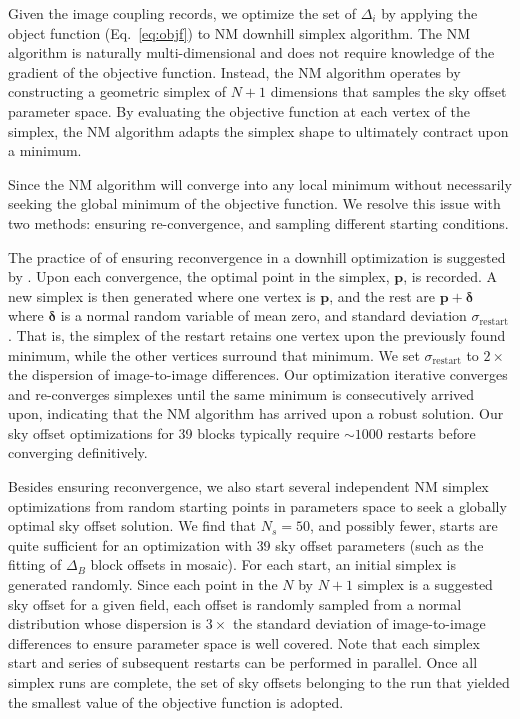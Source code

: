 \documentclass[iop]{emulateapj}
\newcommand{\vect}[1]{\boldsymbol{#1}} %
\newcommand{\Eq}[1]{Eq.~\ref{eq:#1}}  %
\begin{document}
Given the image coupling records, we optimize the set of $\Delta_i$ by applying the object function (\Eq{objf}) to NM downhill simplex algorithm.
The NM algorithm is naturally multi-dimensional and does not require knowledge of the gradient of the objective function.
Instead, the NM algorithm operates by constructing a geometric simplex of $N+1$ dimensions that samples the sky offset parameter space.
By evaluating the objective function at each vertex of the simplex, the NM algorithm adapts the simplex shape to ultimately contract upon a minimum.

Since the NM algorithm will converge into any local minimum without necessarily seeking the global minimum of the objective function.
We resolve this issue with two methods: ensuring re-convergence, and sampling different starting conditions.

The practice of of ensuring reconvergence in a downhill optimization is suggested by \cite{Press:2007}.
Upon each convergence, the optimal point in the simplex, $\vect{p}$, is recorded.
A new simplex is then generated where one vertex is $\vect{p}$, and the rest are $\vect{p}+\vect{\delta}$ where $\vect{\delta}$ is a normal random variable of mean zero, and standard deviation $\sigma_\mathrm{restart}$.
That is, the simplex of the restart retains one vertex upon the previously found minimum, while the other vertices surround that minimum.
We set $\sigma_\mathrm{restart}$ to $2\times$ the dispersion of image-to-image differences.
Our optimization iterative converges and re-converges simplexes until the same minimum is consecutively arrived upon, indicating that the NM algorithm has arrived upon a robust solution.
Our sky offset optimizations for 39 blocks typically require $\sim1000$ restarts before converging definitively.

Besides ensuring reconvergence, we also start several independent NM simplex optimizations from random starting points in parameters space to seek a globally optimal sky offset solution.
We find that $N_s=50$, and possibly fewer, starts are quite sufficient for an optimization with 39 sky offset parameters (such as the fitting of $\Delta_B$ block offsets in mosaic).
For each start, an initial simplex is generated randomly.
Since each point in the $N$ by $N+1$ simplex is a suggested sky offset for a given field, each offset is randomly sampled from a normal distribution whose dispersion is $3\times$ the standard deviation of image-to-image differences to ensure parameter space is well covered.
Note that each simplex start and series of subsequent restarts can be performed in parallel.
Once all simplex runs are complete, the set of sky offsets belonging to the run that yielded the smallest value of the objective function is adopted.
\end{document}
